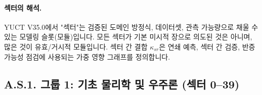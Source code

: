 \documentclass[13pt,a4paper]{article}
\begin{document}
	\paragraph{섹터의 해석.}
	YUCT V35.0에서 "섹터"는 검증된 도메인 방정식, 데이터셋, 관측 가능량으로 채울 수 있는 모델링 슬롯(모듈)입니다. 모든 섹터가 기본 미시적 장으로 의도된 것은 아니며, 많은 것이 유효/거시적 모듈입니다. 섹터 간 결합 $\kappa_{sr}$은 연쇄 예측, 섹터 간 검증, 반증 가능성 점검에 사용되는 가중 영향 그래프를 정의합니다.
	
	\subsection*{A.S.1. 그룹 1: 기초 물리학 및 우주론 (섹터 0--39)}
	
\end{document}
